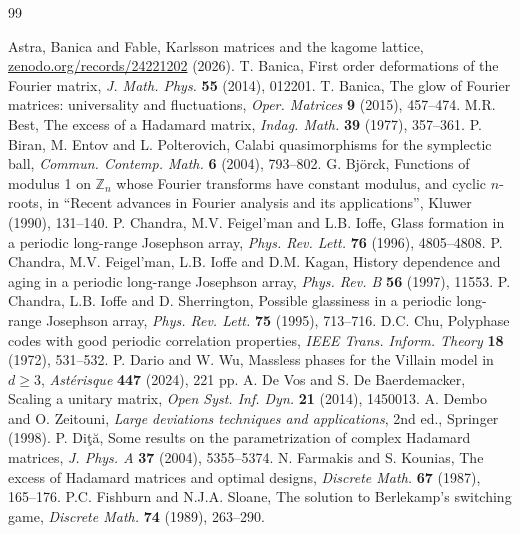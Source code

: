 \documentclass[11pt,a4paper]{article}
\theoremstyle{remark}
\begin{document}
\begin{thebibliography}{99}
\small\setlength{\itemsep}{1pt}\setlength{\parsep}{0pt}
Astra, Banica and Fable, Karlsson matrices and the kagome lattice, {\hypersetup{allcolors=black}\href{https://zenodo.org/records/24221202}{zenodo.org/records/24221202}} (2026).
T. Banica, First order deformations of the Fourier matrix, \emph{J. Math. Phys.} \textbf{55} (2014), 012201.
T. Banica, The glow of Fourier matrices: universality and fluctuations,
\emph{Oper. Matrices} \textbf{9} (2015), 457--474.
M.R. Best, The excess of a Hadamard matrix, \emph{Indag. Math.} \textbf{39} (1977), 357--361.
P. Biran, M. Entov and L. Polterovich, Calabi quasimorphisms for the symplectic ball, \emph{Commun. Contemp. Math.} \textbf{6} (2004), 793--802.
G. Bj\"orck, Functions of modulus 1 on $\mathbb Z_n$ whose Fourier transforms have constant modulus, and cyclic $n$-roots, in ``Recent advances in Fourier analysis and its applications'', Kluwer (1990), 131--140.
P. Chandra, M.V. Feigel'man and L.B. Ioffe, Glass formation in a periodic long-range Josephson array, \emph{Phys. Rev. Lett.} \textbf{76} (1996), 4805--4808.
P. Chandra, M.V. Feigel'man, L.B. Ioffe and D.M. Kagan, History dependence and aging in a periodic long-range Josephson array, \emph{Phys. Rev. B} \textbf{56} (1997), 11553.
P. Chandra, L.B. Ioffe and D. Sherrington, Possible glassiness in a periodic long-range Josephson array, \emph{Phys. Rev. Lett.} \textbf{75} (1995), 713--716.
D.C. Chu, Polyphase codes with good periodic correlation properties, \emph{IEEE Trans. Inform. Theory} \textbf{18} (1972), 531--532.
P. Dario and W. Wu, Massless phases for the Villain model in $d\geq3$,
\emph{Ast\'erisque} \textbf{447} (2024), 221 pp.
A. De Vos and S. De Baerdemacker, Scaling a unitary matrix, \emph{Open Syst. Inf. Dyn.} \textbf{21} (2014), 1450013.
A. Dembo and O. Zeitouni, \emph{Large deviations techniques and applications}, 2nd ed., Springer (1998).
P. Di\c t\u a, Some results on the parametrization of complex Hadamard matrices, \emph{J. Phys. A} \textbf{37} (2004), 5355--5374.
N. Farmakis and S. Kounias, The excess of Hadamard matrices and optimal designs, \emph{Discrete Math.} \textbf{67} (1987), 165--176.
P.C. Fishburn and N.J.A. Sloane, The solution to Berlekamp's switching game, \emph{Discrete Math.} \textbf{74} (1989), 263--290.

\end{thebibliography}
\end{document}
